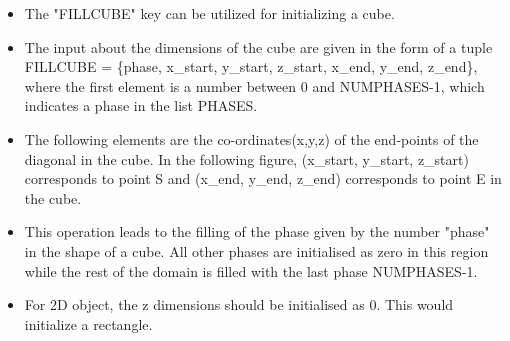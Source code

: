 \documentclass[a4paper,10pt]{article}
\newcommand{\Depth}{2}
\newcommand{\Height}{2}
\newcommand{\Width}{2}
\begin{document}
\begin{itemize}
 \item The "FILLCUBE" key can be utilized for initializing a cube.
 \item The input about the dimensions of the cube are given in the form of a tuple FILLCUBE = \{phase, x\_start, y\_start, z\_start, x\_end, y\_end, z\_end\}, where the 
 first element is a number between 0 and NUMPHASES-1, which indicates a phase in the list PHASES.
 \item The following elements are the co-ordinates(x,y,z) of the end-points of the diagonal in the cube. In the following figure, (x\_start, y\_start, z\_start) corresponds
 to point S and (x\_end, y\_end, z\_end) corresponds to point E in the cube.
 \item This operation leads to the filling of the phase given by the number "phase" in the shape of a cube. All other phases are initialised as zero in this region while the 
 rest of the domain is filled with the last phase NUMPHASES-1.
 \item For 2D object, the z dimensions should be initialised as 0. This would initialize a rectangle.
\end{itemize}


\centering
{}
\end{document}
